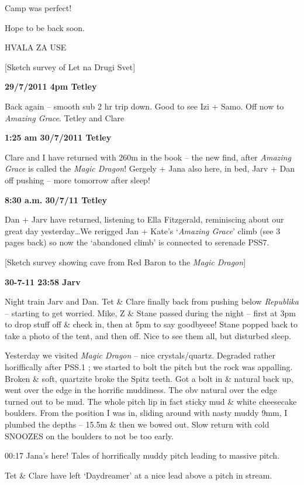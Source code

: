 Camp was perfect!

Hope to be back soon.

HVALA ZA USE

{[}Sketch survey of Let na Drugi Svet{]}

\textbf{29/7/2011 4pm Tetley}

Back again -- smooth sub 2 hr trip down. Good to see Izi + Samo. Off now
to \emph{Amazing Grace}. Tetley and Clare

\textbf{1:25 am 30/7/2011 Tetley}

Clare and I have returned with 260m in the book -- the new find, after
\emph{Amazing Grace} is called the \emph{Magic Dragon}! Gergely + Jana
also here, in bed, Jarv + Dan off pushing -- more tomorrow after sleep!

\textbf{8:30 a.m. 30/7/11 Tetley}

Dan + Jarv have returned, listening to Ella Fitzgerald, reminiscing
about our great day yesterday\ldots{}We rerigged Jan + Kate's
`\emph{Amazing Grace}' climb (see 3 pages back) so now the `abandoned
climb' is connected to serenade PSS7.

{[}Sketch survey showing cave from Red Baron to the \emph{Magic
Dragon}{]}

\textbf{30-7-11 23:58 Jarv}

Night train Jarv and Dan. Tet \& Clare finally back from pushing below
\emph{Republika} -- starting to get worried. Mike, Z \& Stane passed
during the night -- first at 3pm to drop stuff off \& check in, then at
5pm to say goodbyeee! Stane popped back to take a photo of the tent, and
then off. Nice to see them all, but disturbed sleep.

Yesterday we visited \emph{Magic Dragon} -- nice crystals/quartz.
Degraded rather horiffically after PSS.1 ; we started to bolt the pitch
but the rock was appalling. Broken \& soft, quartzite broke the Spitz
teeth. Got a bolt in \& natural back up, went over the edge in the
horrific muddiness. The obv natural over the edge turned out to be mud.
The whole pitch lip in fact sticky mud \& white cheesecake boulders.
From the position I was in, sliding around with nasty muddy 9mm, I
plumbed the depths -- 15.5m \& then we bowed out. Slow return with cold
SNOOZES on the boulders to not be too early.

00:17 Jana's here! Tales of horrifically muddy pitch leading to massive
pitch.

Tet \& Clare have left `Daydreamer' at a nice lead above a pitch in
stream.

